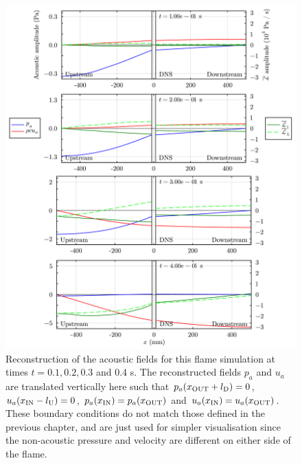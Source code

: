 \begin{figure}[t]
\centering
\includegraphics[scale=0.35]{assets/graphs/2mmx1m_still_ac.pdf}
\caption{Reconstruction of the acoustic fields for this flame simulation at times $t = 0.1, 0.2, 0.3$ and 0.4 s. The reconstructed fields $p_a$ and $u_a$ are translated vertically here such that $p_a(x_{\rm{OUT}} + l_{\rm{D}}) = 0$, $u_a(x_{\rm{IN}} - l_{\rm{U}}) = 0$, $p_a(x_{\rm{IN}}) = p_a(x_{\rm{OUT}})$ and $u_a(x_{\rm{IN}}) = u_a(x_{\rm{OUT}})$. These boundary conditions do not match those defined in the previous chapter, and are just used for simpler visualisation since the non-acoustic pressure and velocity are different on either side of the flame.}
\label{fig:thermoac-reconstruct}
\end{figure}

